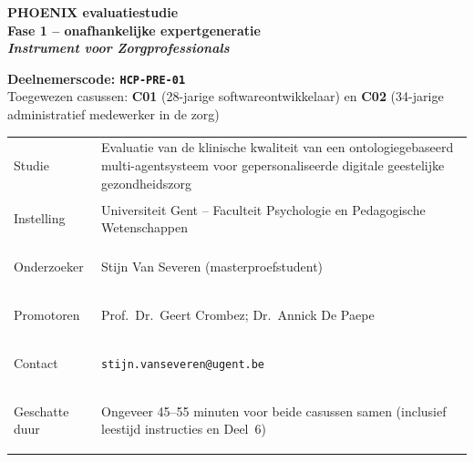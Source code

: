 \documentclass[11pt,a4paper]{article}
\renewcommand{\arraystretch}{1.28}
\begin{document}
\thispagestyle{fancy}
\vspace*{0.3cm}

\begin{tcolorbox}[
  colback=DarkBlue,colframe=DarkBlue,
  arc=3mm,left=14pt,right=14pt,top=12pt,bottom=12pt,
  width=\textwidth
]
\centering
{\fontsize{22}{28}\selectfont\bfseries\color{white}
PHOENIX evaluatiestudie\\[0.3em]
\fontsize{15}{20}\selectfont\color{AccentBlue}
Fase 1 -- onafhankelijke expertgeneratie\\[0.2em]
\fontsize{12}{16}\selectfont\color{white}
\textit{Instrument voor Zorgprofessionals}
}
\end{tcolorbox}

\vspace{0.6cm}

\begin{center}
\begin{tcolorbox}[
  colback=AccentBlue,colframe=PrimaryBlue,
  arc=2.5mm,boxrule=1.2pt,left=12pt,right=12pt,top=10pt,bottom=10pt,
  width=0.86\textwidth
]
\centering
{\large\bfseries\color{DarkBlue}Deelnemerscode: \texttt{HCP-PRE-01}}\\[0.5em]
{\normalsize\color{SlateMid}
Toegewezen casussen:\quad
\textbf{\color{PrimaryBlue}C01} (28-jarige softwareontwikkelaar)
\quad en \quad
\textbf{\color{PrimaryBlue}C02} (34-jarige administratief medewerker in de zorg)
}
\end{tcolorbox}
\end{center}

\vspace{0.5cm}

\begin{center}
\begin{tcolorbox}[
  colback=SoftBG,colframe=BorderGrey,
  arc=2mm,left=10pt,right=10pt,top=9pt,bottom=9pt,
  width=0.92\textwidth
]
\small\renewcommand{\arraystretch}{1.28}
\begin{tabularx}{\textwidth}{@{}>{\bfseries\raggedright\arraybackslash}p{}X@{}}
Studie & Evaluatie van de klinische kwaliteit van een ontologiegebaseerd multi-agentsysteem voor gepersonaliseerde digitale geestelijke gezondheidszorg \\
Instelling & Universiteit Gent -- Faculteit Psychologie en Pedagogische Wetenschappen \\
Onderzoeker & Stijn Van Severen (masterproefstudent) \\
Promotoren & Prof.\ Dr.\ Geert Crombez; Dr.\ Annick De Paepe \\
Contact & \texttt{stijn.vanseveren@ugent.be} \\
Geschatte duur & Ongeveer 45--55 minuten voor beide casussen samen (inclusief leestijd instructies en Deel~6) \\
\end{tabularx}
\end{tcolorbox}
\end{center}
\end{document}
